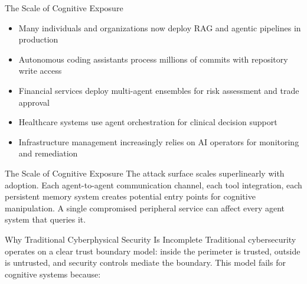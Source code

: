 \documentclass[
  ignorenonframetext,
]{beamer}
\begin{document}
\begin{frame}[allowframebreaks]{The Scale of Cognitive Exposure}
\begin{itemize}
\item Many individuals and organizations now deploy RAG and agentic pipelines in production
\item Autonomous coding assistants process millions of commits with repository write access
\item Financial services deploy multi-agent ensembles for risk assessment and trade approval
\item Healthcare systems use agent orchestration for clinical decision support
\item Infrastructure management increasingly relies on AI operators for monitoring and remediation
\end{itemize}

\end{frame}

\begin{frame}[allowframebreaks]{The Scale of Cognitive Exposure}
The attack surface scales superlinearly with adoption. Each
agent-to-agent communication channel, each tool integration, each
persistent memory system creates potential entry points for cognitive
manipulation. A single compromised peripheral service can affect every
agent system that queries it.
\end{frame}

\begin{frame}[allowframebreaks]{Why Traditional Cyberphysical Security
Is Incomplete}
\protect{}\label{why-traditional-cyberphysical-security-is-incomplete}
Traditional cybersecurity operates on a clear trust boundary model:
inside the perimeter is trusted, outside is untrusted, and security
controls mediate the boundary. This model fails for cognitive systems
because:

\end{frame}
\end{document}
